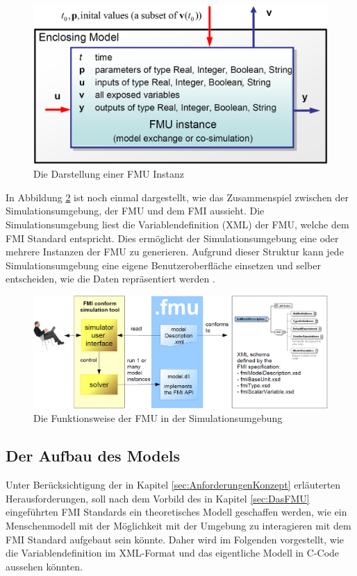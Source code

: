\begin{figure}[h]
	\centering
	\includegraphics[width=0.5\linewidth]{Bilder/A21_FMIBlock}
	\caption{Die Darstellung einer FMU Instanz \cite[S.9]{25}}
	\label{fig:FMIBlock}
\end{figure}
\newline
In Abbildung \ref{fig:FMUEinordnung} ist noch einmal dargestellt, wie das Zusammenspiel zwischen der Simulationsumgebung, der FMU und dem FMI aussieht. Die Simulationsumgebung liest die Variablendefinition (XML) der FMU, welche dem FMI Standard entspricht. Dies ermöglicht der Simulationsumgebung eine oder mehrere Instanzen der FMU zu generieren. Aufgrund dieser Struktur kann jede Simulationsumgebung eine eigene Benutzeroberfläche einsetzen und selber entscheiden, wie die Daten repräsentiert werden \cite[S.7]{26}.
\begin{figure}[h]
	\centering
	\includegraphics[width=1\linewidth]{Bilder/A22_User-FMU-FMI}
	\caption{Die Funktionsweise der FMU in der Simulationsumgebung \cite[S.7]{26}}
	\label{fig:FMUEinordnung}
\end{figure}

\subsection{Der Aufbau des Models}\label{sec:ModelAufbau}
Unter Berücksichtigung der in Kapitel \ref*{sec:AnforderungenKonzept} erläuterten Herausforderungen, soll nach dem Vorbild des in Kapitel \ref*{sec:DasFMU} eingeführten FMI Standards ein theoretisches Modell geschaffen werden, wie ein Menschenmodell mit der Möglichkeit mit der Umgebung zu interagieren mit dem FMI Standard aufgebaut sein könnte. Daher wird im Folgenden vorgestellt, wie die Variablendefinition im XML-Format und das eigentliche Modell in C-Code aussehen könnten.


